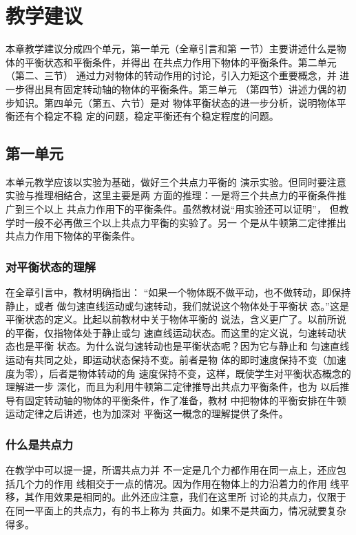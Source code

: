 \section{教学建议}
本章教学建议分成四个单元，第一单元（全章引言和第
一节）主要讲述什么是物体的平衡状态和平衡条件，并得出
在共点力作用下物体的平衡条件。第二单元（第二、三节）
通过力对物体的转动作用的讨论，引入力矩这个重要概念，并
进一步得出具有固定转动轴的物体的平衡条件。第三单元
（第四节）讲述力偶的初步知识。第四单元（第五、六节）是对
物体平衡状态的进一步分析，说明物体平衡还有个稳定不稳
定的问题，稳定平衡还有个稳定程度的问题。

\subsection{第一单元}
本单元教学应该以实验为基础，做好三个共点力平衡的
演示实验。但同时要注意实验与推理相结合，这里主要是两
方面的推理：一是将三个共点力的平衡条件推广到三个以上
共点力作用下的平衡条件。虽然教材说“用实验还可以证明”，
但教学时一般不必再做三个以上共点力平衡的实验了。另一
个是从牛顿第二定律推出共点力作用下物体的平衡条件。

\subsubsection{对平衡状态的理解}

在全章引言中，教材明确指出：
“如果一个物体既不做平动，也不做转动，即保持静止，或者
做匀速直线运动或匀速转动，我们就说这个物体处于平衡状
态。”这是平衡状态的定义。比起以前教材中关于物体平衡的
说法，含义更广了。以前所说的平衡，仅指物体处于静止或匀
速直线运动状态。而这里的定义说，匀速转动状态也是平衡
状态。为什么说匀速转动也是平衡状态呢？因为它与静止和
匀速直线运动有共同之处，即运动状态保持不变。前者是物
体的即时速度保持不变（加速度为零），后者是物体转动的角
速度保持不变，这样，既使学生对平衡状态概念的理解进一步
深化，而且为利用牛顿第二定律推导出共点力平衡条件，也为
以后推导有固定转动轴的物体的平衡条件，作了准备，教材
中把物体的平衡安排在牛顿运动定律之后讲述，也为加深对
平衡这一概念的理解提供了条件。

\subsubsection{什么是共点力}

在教学中可以提一提，所谓共点力并
不一定是几个力都作用在同一点上，还应包括几个力的作用
线相交于一点的情况。因为作用在物体上的力沿着力的作用
线平移，其作用效果是相同的。此外还应注意，我们在这里所
讨论的共点力，仅限于在同一平面上的共点力，有的书上称为
共面力。如果不是共面力，情况就要复杂得多。

